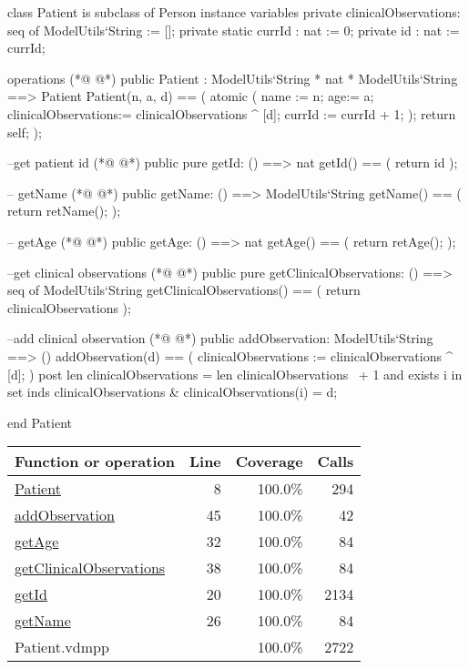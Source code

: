 \begin{vdmpp}[breaklines=true]
class Patient is subclass of Person
instance variables
 private clinicalObservations: seq of ModelUtils`String := [];
 private static currId : nat := 0;
 private id : nat := currId;
 
operations
(*@
\label{Patient:8}
@*)
 public Patient : ModelUtils`String * nat * ModelUtils`String ==> Patient
 Patient(n, a, d) == (
  atomic (
   name := n;
   age:= a;
   clinicalObservations:= clinicalObservations ^ [d];
   currId := currId + 1;
  );
  return self;
 );
  
 --get patient id
(*@
\label{getId:20}
@*)
 public pure getId: () ==> nat
 getId() == (
  return id
 );
 
 -- getName
(*@
\label{getName:26}
@*)
  public getName: () ==> ModelUtils`String
  getName() == (
    return retName();  
  );

  -- getAge 
(*@
\label{getAge:32}
@*)
  public getAge: () ==> nat
  getAge() == (
    return retAge();  
  );
  
 --get clinical observations
(*@
\label{getClinicalObservations:38}
@*)
 public pure getClinicalObservations: () ==> seq of ModelUtils`String
 getClinicalObservations() == (
  return clinicalObservations
 );
 
 
 --add clinical observation
(*@
\label{addObservation:45}
@*)
 public addObservation: ModelUtils`String ==> ()
 addObservation(d) == (
  clinicalObservations := clinicalObservations ^ [d];
 )
 post len clinicalObservations = len clinicalObservations~ + 1 and
    exists i in set inds clinicalObservations & clinicalObservations(i) = d;
 
 
end Patient
\end{vdmpp}
\bigskip
\begin{longtable}{|l|r|r|r|}
\hline
Function or operation & Line & Coverage & Calls \\
\hline
\hline
\hyperref[Patient:8]{Patient} & 8&100.0\% & 294 \\
\hline
\hyperref[addObservation:45]{addObservation} & 45&100.0\% & 42 \\
\hline
\hyperref[getAge:32]{getAge} & 32&100.0\% & 84 \\
\hline
\hyperref[getClinicalObservations:38]{getClinicalObservations} & 38&100.0\% & 84 \\
\hline
\hyperref[getId:20]{getId} & 20&100.0\% & 2134 \\
\hline
\hyperref[getName:26]{getName} & 26&100.0\% & 84 \\
\hline
\hline
Patient.vdmpp & & 100.0\% & 2722 \\
\hline
\end{longtable}

